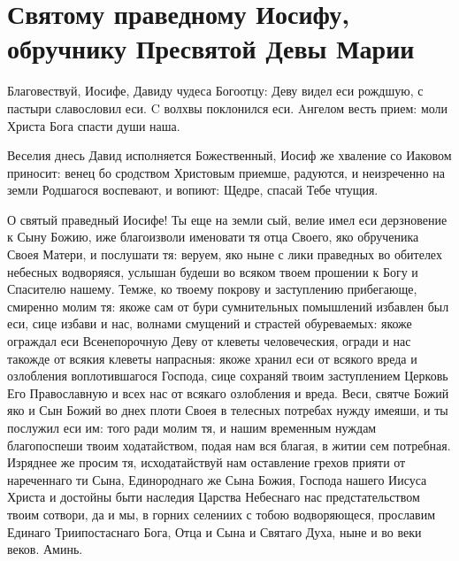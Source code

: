  
\vspace{-\baselineskip}
\section{Святому праведному Иосифу, обручнику Пресвятой Девы Марии}
 



Благовествуй, Иосифе, Давиду чудеса Богоотцу: Деву видел еси рождшую, с пастыри славословил еси. C волхвы поклонился еси. Aнгелом весть прием: моли Христа Бога спасти души наша. 



Веселия днесь Давид исполняется Божественный, Иосиф же хваление со Иаковом приносит: венец бо сродством Христовым приемше, радуются, и неизреченно на земли Родшагося воспевают, и вопиют: Щедре, спасай Тебе чтущия.



 О святый праведный Иосифе! Ты еще на земли сый, велие имел еси дерзновение к Сыну Божию, иже благоизволи именовати тя отца Своего, яко обрученика Своея Матери, и послушати тя: веруем, яко ныне с лики праведных во обителех небесных водворяяся, услышан будеши во всяком твоем прошении к Богу и Спасителю нашему. Темже, ко твоему покрову и заступлению прибегающе, смиренно молим тя: якоже сам от бури сумнительных помышлений избавлен был еси, сице избави и нас, волнами смущений и страстей обуреваемых: якоже ограждал еси Всенепорочную Деву от клеветы человеческия, огради и нас такожде от всякия клеветы напрасныя: якоже хранил еси от всякого вреда и озлобления воплотившагося Господа, сице сохраняй твоим заступлением Церковь Его Православную и всех нас от всякаго озлобления и вреда. Веси, святче Божий яко и Сын Божий во днех плоти Своея в телесных потребах нужду имеяши, и ты послужил еси им: того ради молим тя, и нашим временным нуждам благопоспеши твоим ходатайством, подая нам вся благая, в житии сем потребная. Изряднее же просим тя, исходатайствуй нам оставление грехов прияти от нареченнаго ти Сына, Единороднаго же Сына Божия, Господа нашего Иисуса Христа и достойны быти наследия Царства Небеснаго нас предстательством твоим сотвори, да и мы, в горних селениих с тобою водворяющеся, прославим Единаго Триипостаснаго Бога, Отца и Сына и Святаго Духа, ныне и во веки веков. Аминь.
\mychapterending


